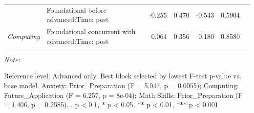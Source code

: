 \begin{table}[!h]
\begin{threeparttable}
\begin{tabular}[t]{>{}llrrrrl}
 & Foundational before advanced:Time: post & -0.255 & 0.470 & -0.543 & 0.5904 & \\

\multirow[t]{-11}{*}[\normalbaselineskip]{\raggedright\arraybackslash \em{Computing}} & Foundational concurrent with advanced:Time: post & 0.064 & 0.356 & 0.180 & 0.8580 & \\
\bottomrule
\end{tabular}
\begin{tablenotes}[para]
\item \textit{Note: } 
\item Reference level: Advanced only. Best block selected by lowest F-test p-value vs. base model. Anxiety: Prior\_Preparation (F = 5.047, p = 0.0055); Computing: Future\_Application (F = 6.257, p = 8e-04); Math Skills: Prior\_Preparation (F = 1.406, p = 0.2585). . p < 0.1, * p < 0.05, ** p < 0.01, *** p < 0.001
\end{tablenotes}
\end{threeparttable}
\end{table}
